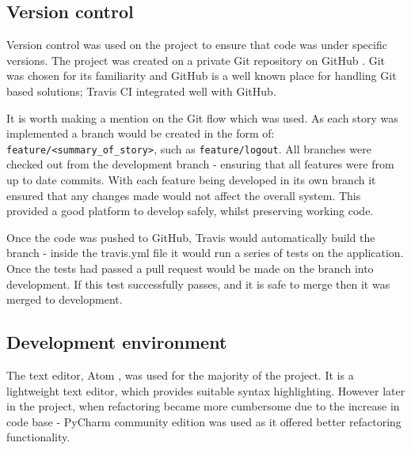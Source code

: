 \subsection{Version control}
Version control was used on the project to ensure that code was under specific versions. The project was created on a private Git \cite{citeulike:14023846} repository on GitHub \cite{citeulike:13269771}. Git was chosen for its familiarity and GitHub is a well known place for handling Git based solutions; Travis CI integrated well with GitHub.

It is worth making a mention on the Git flow which was used. As each story was implemented a branch would be created in the form of: \texttt{feature/<summary\_of\_story>}, such as \texttt{feature/logout}. All branches were checked out from the development branch - ensuring that all features were from up to date commits. With each feature being developed in its own branch it ensured that any changes made would not affect the overall system. This provided a good platform to develop safely, whilst preserving working code.

Once the code was pushed to GitHub, Travis would automatically build the branch - inside the travis.yml file it would run a series of tests on the application. Once the tests had passed a pull request would be made on the branch into development. If this test successfully passes, and it is safe to merge then it was merged to development.

\subsection{Development environment}
The text editor, Atom \cite{citeulike:14023852}, was used for the majority of the project. It is a lightweight text editor, which provides suitable syntax highlighting. However later in the project, when refactoring became more cumbersome due to the increase in code base - PyCharm community edition \cite{citeulike:14023855} was used as it offered better refactoring functionality.

